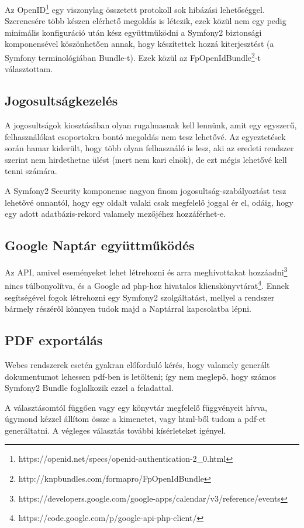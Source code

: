 \documentclass[a4paper,12pt,oneside]{report}
\begin{document}
Az OpenID\footnote{https://openid.net/specs/openid-authentication-2\_0.html} egy viszonylag összetett protokoll sok hibázási lehetőséggel. Szerencsére több készen elérhető megoldás is létezik, ezek közül nem egy pedig minimális konfiguráció után kész együttműködni a Symfony2 biztonsági komponensével köszönhetően annak, hogy készítettek hozzá kiterjesztést (a Symfony terminológiában Bundle-t). Ezek közül az FpOpenIdBundle\footnote{http://knpbundles.com/formapro/FpOpenIdBundle}-t választottam.

\subsection{Jogosultságkezelés}

A jogosultságok kiosztásában olyan rugalmasnak kell lennünk, amit egy egyszerű, felhasználókat csoportokra bontó megoldás nem tesz lehetővé. Az egyeztetések során hamar kiderült, hogy több olyan felhasználó is lesz, aki az eredeti rendszer szerint nem hirdethetne ülést (mert nem kari elnök), de ezt mégis lehetővé kell tenni számára.

A Symfony2 Security komponense nagyon finom jogosultság-szabályoztást tesz lehetővé onnantól, hogy egy oldalt valaki csak megfelelő joggal ér el, odáig, hogy egy adott adatbázis-rekord valamely mezőjéhez hozzáférhet-e.

\subsection{Google Naptár együttműködés}

Az API, amivel eseményeket lehet létrehozni és arra meghívottakat hozzáadni\footnote{https://developers.google.com/google-apps/calendar/v3/reference/events} nincs túlbonyolítva, és a Google ad php-hoz hivatalos klienskönyvtárat\footnote{https://code.google.com/p/google-api-php-client/}. Ennek segítségével fogok létrehozni egy Symfony2 szolgáltatást, mellyel a rendszer bármely részéről könnyen tudok majd a Naptárral kapcsolatba lépni.

\subsection{PDF exportálás}

Webes rendszerek esetén gyakran előforduló kérés, hogy valamely generált dokumentumot lehessen pdf-ben is letölteni; így nem meglepő, hogy számos Symfony2 Bundle foglalkozik ezzel a feladattal.

A választásomtól függően vagy egy könyvtár megfelelő függvényeit hívva, úgymond kézzel állítom össze a kimenetet, vagy html-ből tudom a pdf-et generáltatni. A végleges választás további kísérleteket igényel.
\end{document}
